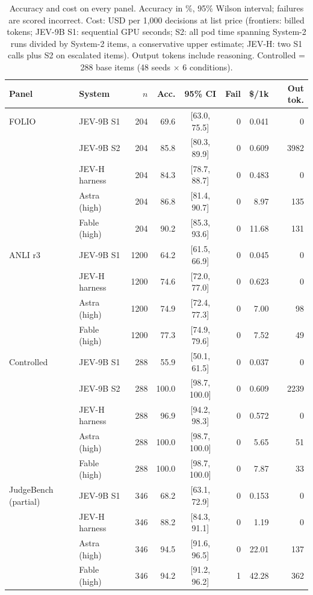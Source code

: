 \begin{table}[t]
\centering\small
\caption{Accuracy and cost on every panel. Accuracy in \%, 95\% Wilson interval; failures are scored incorrect.
Cost: USD per 1{,}000 decisions at list price (frontiers: billed tokens; JEV-9B S1: sequential GPU seconds; S2: all pod time spanning System-2 runs divided by System-2 items, a conservative upper estimate; JEV-H: two S1 calls plus S2 on escalated items).
Output tokens include reasoning. Controlled = 288 base items (48 seeds $\times$ 6 conditions).}
\label{tab:main}
\begin{tabular}{@{}llrrcrrr@{}}
\toprule
Panel & System & $n$ & Acc. & 95\% CI & Fail & \$/1k & Out tok. \\
\midrule
FOLIO & JEV-9B S1 & 204 & 69.6 & [63.0, 75.5] & 0 & 0.041 & 0 \\
 & JEV-9B S2 & 204 & 85.8 & [80.3, 89.9] & 0 & 0.609 & 3982 \\
 & JEV-H harness & 204 & 84.3 & [78.7, 88.7] & 0 & 0.483 & 0 \\
 & Astra (high) & 204 & 86.8 & [81.4, 90.7] & 0 & 8.97 & 135 \\
 & Fable (high) & 204 & 90.2 & [85.3, 93.6] & 0 & 11.68 & 131 \\
\addlinespace
ANLI r3 & JEV-9B S1 & 1200 & 64.2 & [61.5, 66.9] & 0 & 0.045 & 0 \\
 & JEV-H harness & 1200 & 74.6 & [72.0, 77.0] & 0 & 0.623 & 0 \\
 & Astra (high) & 1200 & 74.9 & [72.4, 77.3] & 0 & 7.00 & 98 \\
 & Fable (high) & 1200 & 77.3 & [74.9, 79.6] & 0 & 7.52 & 49 \\
\addlinespace
Controlled & JEV-9B S1 & 288 & 55.9 & [50.1, 61.5] & 0 & 0.037 & 0 \\
 & JEV-9B S2 & 288 & 100.0 & [98.7, 100.0] & 0 & 0.609 & 2239 \\
 & JEV-H harness & 288 & 96.9 & [94.2, 98.3] & 0 & 0.572 & 0 \\
 & Astra (high) & 288 & 100.0 & [98.7, 100.0] & 0 & 5.65 & 51 \\
 & Fable (high) & 288 & 100.0 & [98.7, 100.0] & 0 & 7.87 & 33 \\
\addlinespace
JudgeBench (partial) & JEV-9B S1 & 346 & 68.2 & [63.1, 72.9] & 0 & 0.153 & 0 \\
 & JEV-H harness & 346 & 88.2 & [84.3, 91.1] & 0 & 1.19 & 0 \\
 & Astra (high) & 346 & 94.5 & [91.6, 96.5] & 0 & 22.01 & 137 \\
 & Fable (high) & 346 & 94.2 & [91.2, 96.2] & 1 & 42.28 & 362 \\

\end{tabular}
\end{table}
